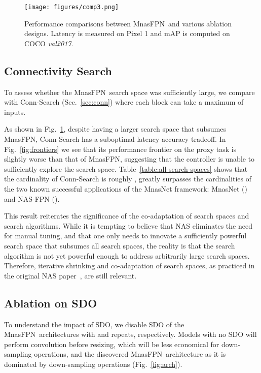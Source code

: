 \documentclass[10pt,twocolumn,letterpaper]{article}
\def\Mnasfpn{MnasFPN~}
\def\Mnasfpnnospace{MnasFPN}
\begin{document}
\begin{figure}[!t]
    \centering
    \texttt{[image: figures/comp3.png]}
    \caption{Performance comparisons between \Mnasfpn and various ablation designs. Latency is measured on Pixel 1 and mAP is computed on COCO {\it val2017}.}
    \label{fig:comp}
\end{figure}


\subsection{Connectivity Search}
To assess whether the \Mnasfpn search space was sufficiently large, we compare with Conn-Search (Sec.~\ref{sec:conn}) where each block can take a maximum of  inputs.





As shown in Fig.~\ref{fig:comp}, despite having a larger search space that subsumes \Mnasfpnnospace, Conn-Search has a suboptimal latency-accuracy tradeoff. In Fig.~\ref{fig:frontiers} we see that its performance frontier on the proxy task is slightly worse than that of \Mnasfpnnospace, suggesting that the controller is unable to sufficiently explore the search space. Table~\ref{table:all-search-spaces} shows that the cardinality of Conn-Search is roughly , greatly surpasses the cardinalities of the two known successful applications of the MnasNet framework: MnasNet () and NAS-FPN ().

This result reiterates the significance of the co-adaptation of search spaces and search algorithms. While it is tempting to believe that NAS eliminates the need for manual tuning, and that one only needs to innovate a sufficiently powerful search space that subsumes all search spaces, the reality is that the search algorithm is not yet powerful enough to address arbitrarily large search spaces. Therefore, iterative shrinking and co-adaptation of search spaces, as practiced in the original NAS paper~\cite{zoph2016neural}, are still relevant.


\subsection{Ablation on SDO}
\label{sec:ablation-sdo}
To understand the impact of SDO, we disable SDO of the \Mnasfpn architectures with  and  repeats, respectively. Models with no SDO will perform  convolution before resizing, which will be less economical for down-sampling operations, and the discovered \Mnasfpn architecture as it is dominated by down-sampling operations (Fig.~\ref{fig:arch}).
\end{document}
